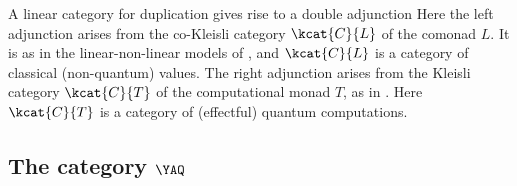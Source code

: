 \documentclass{llncs}
\begin{document}
\begin{remark}
  A linear category for duplication gives rise to a double adjunction
  Here the left adjunction arises from the co-Kleisli category
  $\kcat{C}{L}$ of the comonad $L$. It is as in the linear-non-linear
  models of {\cite{benton94mixed}}, and $\kcat{C}{L}$ is a category of
  classical (non-quantum) values. The right adjunction arises from the
  Kleisli category $\kcat{C}{T}$ of the computational monad $T$, as in
  \cite{moggi91notions}. Here $\kcat{C}{T}$ is a category of
  (effectful) quantum computations.
\end{remark}



\subsection{The category $\YAQ$}
\label{sec-yaq}
\end{document}
